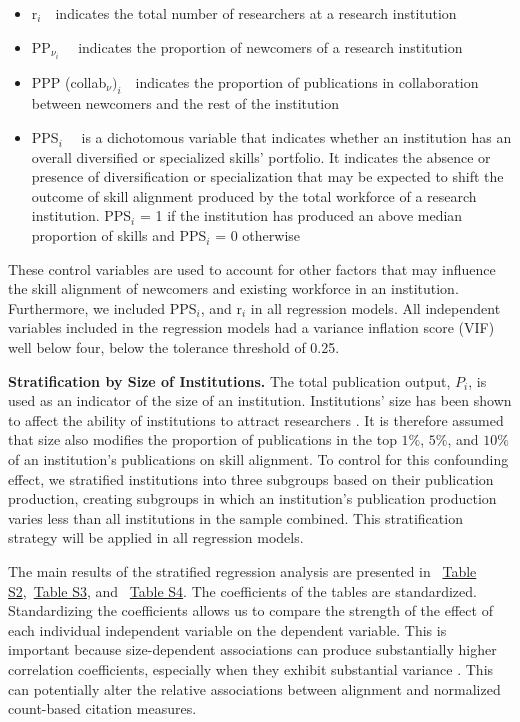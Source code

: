 \documentclass[draft,final]{vutinfth} %
\begin{document}
\begin{itemize} 
  \item r$_{i}$~\textequal~indicates the total number of researchers at a research institution 
  \item PP$_{\nu_i}$~\textequal~ indicates the proportion of newcomers of a research institution
  \item PPP (collab$_\nu)_{i}$~\textequal~indicates the proportion of publications in collaboration between newcomers and the rest of the institution
 \item PPS$_{i}$~\textequal~ is a dichotomous variable that indicates whether an institution has an overall diversified or specialized skills' portfolio. It indicates the absence or presence of diversification or specialization that may be expected to shift the outcome of skill alignment produced by the total workforce of a research institution. PPS$_{i}$ = 1 if the institution has produced an above median proportion of skills and PPS$_{i}$ = 0 otherwise
\end{itemize}

These control variables are used to account for other factors that may influence the skill alignment of newcomers and existing workforce in an institution. Furthermore, we included PPS$_{i}$, and r$_{i}$ in all regression models. All independent variables included in the regression models had a variance inflation score (VIF) well below four, below the tolerance threshold of 0.25. 

\textbf{Stratification by Size of Institutions.} The total publication output, $P_{i}$, is used as an indicator of the size of an institution. Institutions' size has been shown to affect the ability of institutions to attract researchers \cite{machavcek2022researchers, clauset2015systematic, Zhang22}. It is therefore assumed that size also modifies the proportion of publications in the top $1\%$, $5\%$, and $10\%$ of an institution's publications on skill alignment. To control for this confounding effect, we stratified institutions into three subgroups based on their publication production, creating subgroups in which an institution's publication production varies less than all institutions in the sample combined. This stratification strategy will be applied in all regression models.

The main results of the stratified regression analysis are presented in ~\hyperref[Table S2]{Table S2},~\hyperref[Table S3]{Table S3}, and ~\hyperref[Table S4]{Table S4}. The coefficients of the tables are standardized. Standardizing the coefficients allows us to compare the strength of the effect of each individual independent variable on the dependent variable. This is important because size-dependent associations can produce substantially higher correlation coefficients, especially when they exhibit substantial variance \cite{traag2019systematic}. This can potentially alter the relative associations between alignment and normalized count-based citation measures. 
\end{document}
